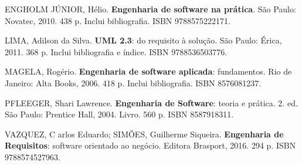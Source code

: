 \begin{pud}
\begin{bibbasica}
	\end{bibbasica}
	
	\begin{bibcomplementar}
	
		
		
		\item ENGHOLM JÚNIOR, Hélio. \textbf{Engenharia de software na prática}. São Paulo: Novatec, 2010. 438 p. Inclui bibliografia. ISBN 9788575222171.
		\item LIMA, Adilson da Silva. \textbf{UML 2.3}: do requisito à solução. São Paulo: Érica, 2011. 368 p. Inclui bibliografia e índice. ISBN 9788536503776.
		\item MAGELA, Rogério. \textbf{Engenharia de software aplicada}: fundamentos. Rio de Janeiro: Alta Books, 2006. 418 p. Inclui bibliografia. ISBN 8576081237.
		\item PFLEEGER, Shari Lawrence. \textbf{Engenharia de Software}: teoria e prática. 2. ed. São Paulo: Prentice Hall, 2004. Livro. 560 p.  ISBN 8587918311.
		\item  VAZQUEZ, C	arlos Eduardo; SIM\~OES, Guilherme Siqueira. \textbf{Engenharia de Requisitos}: software orientado ao negócio. Editora Brasport, 2016.  294 p. ISBN 9788574527963. 
		

% 		 
	\end{bibcomplementar}
\end{pud}




